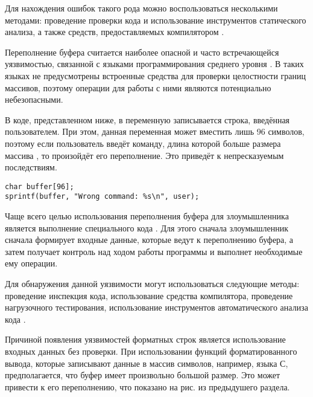%
Для нахождения ошибок такого рода можно воспользоваться несколькими методами: проведение проверки 
кода и использование инструментов статического анализа, а также средств, предоставляемых 
компилятором  .


%
Переполнение буфера считается наиболее опасной и часто встречающейся уязвимостью, связанной 
с языками программирования среднего уровня . 
%
В таких языках не предусмотрены встроенные средства для проверки целостности границ массивов, 
поэтому операции для работы с ними являются потенциально небезопасными. 

%
В коде, представленном ниже, в переменную  записывается строка, введённая 
пользователем. 
%
При этом, данная переменная может вместить лишь 96 символов, поэтому если пользователь введёт 
команду, длина которой больше размера массива , то произойдёт его переполнение.
%
Это приведёт к непресказуемым последствиям.

\lstset {
	language=C++,
	basicstyle=\ttfamily,
	breaklines=true
}

\begin{lstlisting}
char buffer[96]; 
sprintf(buffer, "Wrong command: %s\n", user); 
\end{lstlisting}

%
Чаще всего целью использования переполнения буфера для злоумышленника является выполнение 
специального кода . 
%
Для этого сначала злоумышленник сначала формирует входные данные, которые ведут к переполнению 
буфера, а затем получает контроль над ходом работы программы и выполнет необходимые ему операции. 

%
Для обнаружения данной уязвимости могут использоваться следующие методы: проведение инспекция кода, 
использование средства компилятора, проведение нагрузочного тестирования, использование 
инструментов автоматического анализа кода   
.


%
Причиной появления уязвимостей форматных строк является использование входных данных без проверки. 
%
При использовании функций форматированного вывода, которые записывают данные в массив символов, 
например,  языка С, предполагается, что буфер имеет произвольно большой 
размер. 
%
Это может привести к его переполнению, что показано на рис. из предыдушего раздела.


